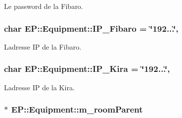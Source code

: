 Le password de la Fibaro. 

\subsubsection[{\texorpdfstring{I\+P\+\_\+\+Fibaro}{IP_Fibaro}}]{\setlength{\rightskip}{0pt plus 5cm}char E\+P\+::\+Equipment\+::\+I\+P\+\_\+\+Fibaro = \char`\"{}192...\char`\"{}\hspace{0.3cm}{\ttfamily [static]}, {\ttfamily [protected]}}\hypertarget{class_e_p_1_1_equipment_a76405ab4adccec1b32a1c874171749e6}{}\label{class_e_p_1_1_equipment_a76405ab4adccec1b32a1c874171749e6}


L\textquotesingle{}adresse IP de la Fibaro. 

\subsubsection[{\texorpdfstring{I\+P\+\_\+\+Kira}{IP_Kira}}]{\setlength{\rightskip}{0pt plus 5cm}char E\+P\+::\+Equipment\+::\+I\+P\+\_\+\+Kira = \char`\"{}192...\char`\"{}\hspace{0.3cm}{\ttfamily [static]}, {\ttfamily [protected]}}\hypertarget{class_e_p_1_1_equipment_a05245b7dd3a4b4e3fb7ab258e6bbe6a2}{}\label{class_e_p_1_1_equipment_a05245b7dd3a4b4e3fb7ab258e6bbe6a2}


L\textquotesingle{}adresse IP de la Kira. 

\subsubsection[{\texorpdfstring{m\+\_\+room\+Parent}{m_roomParent}}]{$\ast$ E\+P\+::\+Equipment\+::m\+\_\+room\+Parent\hspace{0.3cm}{\ttfamily [protected]}}\hypertarget{class_e_p_1_1_equipment_a826ee59574194978cd3e02e8824a0a5a}{}\label{class_e_p_1_1_equipment_a826ee59574194978cd3e02e8824a0a5a}


